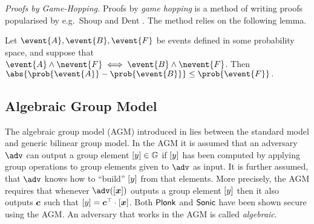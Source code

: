 \documentclass[runningheads,11pt]{llncs}
\let\spvec\vec
\let\vec\accentvec
\let\spvec\vec
\let\vec\spvec
\def\vec#1{\mathchoice{\mbox{\boldmath$\displaystyle#1$}}
  {\mbox{\boldmath$\textstyle#1$}} {\mbox{\boldmath$\scriptstyle#1$}}
  {\mbox{\boldmath$\scriptscriptstyle#1$}}}
\newcommand{\ourpar}[1] {\smallskip\noindent\emph{#1}}
\begin{document}
\ourpar{Proofs by Game-Hopping.}
Proofs by \emph{game hopping} is a method of writing proofs popularised by
e.g.~Shoup \cite{EPRINT:Shoup04} and Dent \cite{EPRINT:Dent06c}. The method
relies on the following lemma.

\begin{lemma}
	\label{lem:difference_lemma}
	Let $\event{A}, \event{B}, \event{F}$ be events defined in some probability
	space, and suppose that $\event{A} \land \nevent{F} \iff \event{B}
		\land \nevent{F}$.  Then 
	$
		\abs{\prob{\event{A}} - \prob{\event{B}}} \leq \prob{\event{F}}\,.
	$
\end{lemma}
\subsection{Algebraic Group Model}
The algebraic group model (AGM) introduced in \cite{C:FucKilLos18} lies between
the standard model and generic bilinear group model. In the AGM it is assumed
that an adversary $\adv$ can output a group element $\left[y\right] \in \mathbb{G}$ if
$\left[y\right]$ has been computed by applying group operations to group elements
given to $\adv$ as input. It is further assumed, that $\adv$ knows how to
``build'' $\left[y\right]$ from that elements. More precisely, the AGM requires that
whenever $\adv(\gnone{\vec{x}})$ outputs a group element $\left[y\right]$ then it
also outputs $\vec{c}$ such that $\gnone{y} = \vec{c}^\top \cdot
\gnone{\vec{x}}$. Both $\textnormal{\textsf{Plonk}}$ and ${\textnormal{\textsf{Sonic}}}$ have been shown secure using the
AGM. An adversary that works in the AGM is called \emph{algebraic}.
\end{document}
